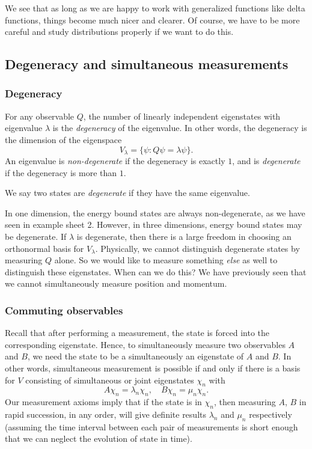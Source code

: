 \documentclass[a4paper]{article}
\begin{document}
We see that as long as we are happy to work with generalized functions like delta functions, things become much nicer and clearer. Of course, we have to be more careful and study distributions properly if we want to do this.

\subsection{Degeneracy and simultaneous measurements}
\subsubsection*{Degeneracy}
\begin{defi}[Degeneracy]
  For any observable $Q$, the number of linearly independent eigenstates with eigenvalue $\lambda$ is the \emph{degeneracy} of the eigenvalue. In other words, the degeneracy is the dimension of the eigenspace
  \[
    V_\lambda = \{\psi: Q \psi = \lambda \psi\}.
  \]
  An eigenvalue is \emph{non-degenerate} if the degeneracy is exactly $1$, and is \emph{degenerate} if the degeneracy is more than $1$.

  We say two states are \emph{degenerate} if they have the same eigenvalue.
\end{defi}
In one dimension, the energy bound states are always non-degenerate, as we have seen in example sheet 2. However, in three dimensions, energy bound states may be degenerate. If $\lambda$ is degenerate, then there is a large freedom in choosing an orthonormal basis for $V_\lambda$. Physically, we cannot distinguish degenerate states by measuring $Q$ alone. So we would like to measure something \emph{else} as well to distinguish these eigenstates. When can we do this? We have previously seen that we cannot simultaneously measure position and momentum.

\subsubsection*{Commuting observables}
Recall that after performing a measurement, the state is forced into the corresponding eigenstate. Hence, to simultaneously measure two observables $A$ and $B$, we need the state to be a simultaneously an eigenstate of $A$ and $B$. In other words, simultaneous measurement is possible if and only if there is a basis for $V$ consisting of simultaneous or joint eigenstates $\chi_n$ with
\[
  A \chi_n = \lambda_n \chi_n,\quad B \chi_n = \mu_n \chi_n.
\]
Our measurement axioms imply that if the state is in $\chi_n$, then measuring $A$, $B$ in rapid succession, in any order, will give definite results $\lambda_n$ and $\mu_n$ respectively (assuming the time interval between each pair of measurements is short enough that we can neglect the evolution of state in time).
\end{document}
